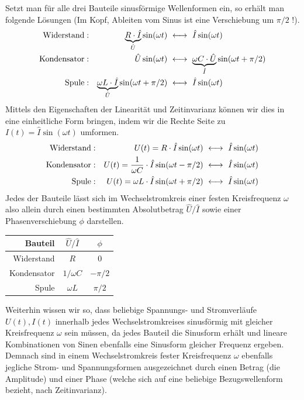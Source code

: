 Setzt man für alle drei Bauteile sinusförmige Wellenformen ein, so erhält man folgende Lösungen (Im Kopf, Ableiten vom
Sinus ist eine Verschiebung um $\pi/2$ !).
\begin{align*}
    \text{Widerstand} &: & \underbrace{R\cdot \hat I}_{\hat U}\sin(\omega t)
    & ~\longleftrightarrow~ \hat{I}\sin(\omega t)
    \\
    \text{Kondensator} &: & \hat U\sin(\omega t)
    & ~\longleftrightarrow~ \underbrace{\omega C \cdot \hat U}_{\hat{I}}\sin(\omega t + \pi/2)
    \\
\text{Spule} &: &  \underbrace{\omega L\cdot \hat I}_{\hat U}\sin(\omega t + \pi/2)
    & ~\longleftrightarrow~ \hat{I}\sin(\omega t)
\end{align*}
Mittels den Eigenschaften der Linearität und Zeitinvarianz können wir dies in eine einheitliche Form bringen, indem wir
die Rechte Seite zu $I(t) = \hat I\sin(\omega t)$ umformen.
\begin{gather}\label{eq:RLC}
\begin{aligned}
    \text{Widerstand} &: & U(t) = R \cdot \hat I\sin(\omega t)
    & ~\longleftrightarrow~ \hat{I}\sin(\omega t)
    \\
    \text{Kondensator} &: & U(t) = {1\over \omega C}\cdot  \hat I\sin(\omega t - \pi/2)
    & ~\longleftrightarrow~ \hat{I}\sin(\omega t)
    \\
\text{Spule} &: &  U(t) = \omega L \cdot \hat I\sin(\omega t + \pi/2)
    & ~\longleftrightarrow~ \hat{I}\sin(\omega t)
\end{aligned}
\end{gather}
Jedes der Bauteile lässt sich im Wechselstromkreis einer festen Kreisfrequenz $\omega$ also allein durch einen
bestimmten Absolutbetrag $\hat U / \hat I$ sowie einer Phasenverschiebung $\phi$ darstellen.
\begin{center}
    \begin{tabular}{rcc}
        Bauteil & $\hat U / \hat I$ & $\phi$ \\
        \hline
        Widerstand & $R$ & 0 \\
        Kondensator & ${1/\omega C}$ & $-\pi/2$ \\
        Spule & $\omega L$ & $\pi/2$
    \end{tabular}
\end{center}

Weiterhin wissen wir so, dass beliebige Spannungs- und Stromverläufe $U(t), I(t)$ innerhalb jedes Wechselstromkreises
sinusförmig mit gleicher Kreisfrequenz $\omega$ sein müssen, da jedes Bauteil die Sinusform erhält und lineare
Kombinationen von Sinen ebenfalls eine Sinusform gleicher Frequenz ergeben. Demnach sind in einem Wechselstromkreis
fester Kreisfrequenz $\omega$ ebenfalls jegliche Strom- und Spannungsformen ausgezeichnet durch einen Betrag (die
Amplitude) und einer Phase (welche sich auf eine beliebige Bezugswellenform bezieht, nach Zeitinvarianz).

